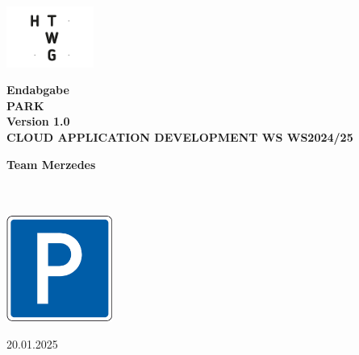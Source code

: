 \begin{titlepage}
    \begin{center}
        \vspace{0.5cm}
        
        \includegraphics[height=2cm]{resources/htwg-logo.png}
        
        \vspace{1.5cm}

        \Huge{\textbf{Endabgabe\\}}
        \vspace{0.5cm}
        \Huge{\textbf{PARK \\ Version 1.0 \\}}
        \vspace{0.5cm}
        \Huge{\textbf{CLOUD APPLICATION DEVELOPMENT WS WS2024/25}}
    
        \vspace{1.5cm}
 
        \Large{
            \textbf{Team Merzedes} \\
            \authorjonas \\
            \authorlukasb \\
            \authorlukase
        }
 
        \vspace{1.5cm}
        
        \includegraphics[height=3.5cm]{resources/logo.png}

        \vspace{1.5cm}

        \large{20.01.2025}
      
    \end{center}
 \end{titlepage}

\newpage
